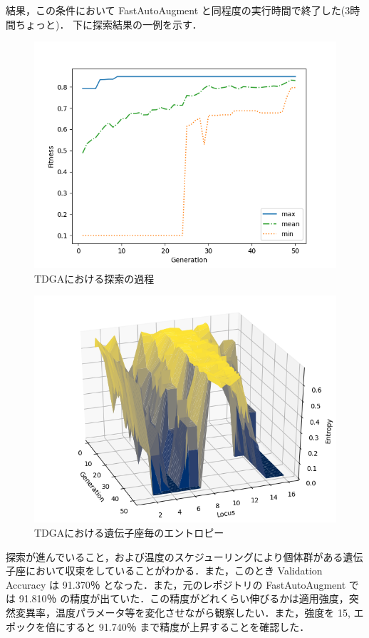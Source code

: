 \documentclass[onecolumn]{ujarticle}   %
\begin{document}
  結果，この条件において FastAutoAugment と同程度の実行時間で終了した(3時間ちょっと)．
  下に探索結果の一例を示す．

  \begin{figure}[h]
		\begin{center}
			\includegraphics[width=0.7\columnwidth]{stats_TDGA.png}
			\caption{TDGAにおける探索の過程}
			\label{fig:TDGA_stats}
		\end{center}
	\end{figure}

  \begin{figure}[h]
		\begin{center}
			\includegraphics[width=0.7\columnwidth]{entropy_TDGA.png}
			\caption{TDGAにおける遺伝子座毎のエントロピー}
			\label{fig:TDGA_entropy}
		\end{center}
	\end{figure}

  探索が進んでいること，および温度のスケジューリングにより個体群がある遺伝子座において収束をしていることがわかる．また，このとき Validation Accuracy は 91.370％ となった．また，元のレポジトリの FastAutoAugment では  91.810％ の精度が出ていた．この精度がどれくらい伸びるかは適用強度，突然変異率，温度パラメータ等を変化させながら観察したい．また，強度を 15, エポックを倍にすると 91.740％ まで精度が上昇することを確認した．
\end{document}
